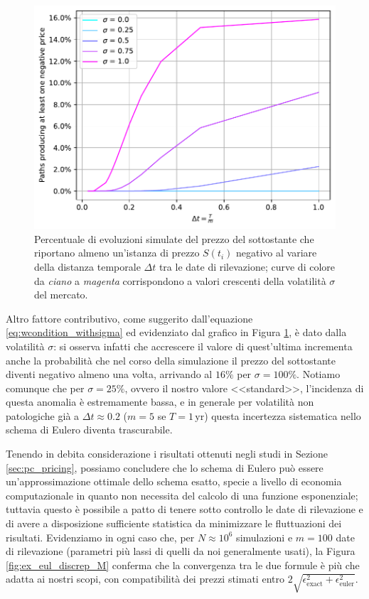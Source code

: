 \begin{figure}[t] 
    \centering
    \includegraphics[scale=0.5]{graphs/NegativePrices_PercentageVsM_VariousSigmas.pdf}
    \caption[Percentuale di evoluzioni simulate del prezzo del sottostante che riportano almeno un'istanza di prezzo negativo al variare della distanza temporale $\Delta t$ tra le date di rilevazione.]{Percentuale di evoluzioni simulate del prezzo del sottostante che riportano almeno un'istanza di prezzo $S(t_i)$ negativo al variare della distanza temporale $\Delta t$ tra le date di rilevazione; curve di colore da \textit{ciano} a \textit{magenta} corrispondono a valori crescenti della volatilità $\sigma$ del mercato.}
    \label{fig:negativeprices}
\end{figure}

Altro fattore contributivo, come suggerito dall'equazione \eqref{eq:wcondition_withsigma} ed evidenziato dal grafico in Figura \ref{fig:negativeprices}, è dato dalla volatilità $\sigma$: si osserva infatti che accrescere il valore di quest'ultima incrementa anche la probabilità che nel corso della simulazione il prezzo del sottostante diventi negativo almeno una volta, arrivando al $16\%$ per $\sigma=100\%$. Notiamo comunque che per $\sigma=25\%$, ovvero il nostro valore <<standard>>, l'incidenza di questa anomalia è estremamente bassa, e in generale per volatilità non patologiche già a $\Delta t \approx 0.2$ ($m=5$ se $T=1 \, \text{yr}$) questa incertezza sistematica nello schema di Eulero diventa trascurabile.

Tenendo in debita considerazione i risultati ottenuti negli studi in Sezione \ref{sec:pc_pricing}, possiamo concludere che lo schema di Eulero può essere un'approssimazione ottimale dello schema esatto, specie a livello di economia computazionale in quanto non necessita del calcolo di una funzione esponenziale; tuttavia questo è possibile a patto di tenere sotto controllo le date di rilevazione e di avere a disposizione sufficiente statistica da minimizzare le fluttuazioni dei risultati. Evidenziamo in ogni caso che, per $N\approx 10^6$ simulazioni e $m = 100$ date di rilevazione (parametri più lassi di quelli da noi generalmente usati), la Figura \ref{fig:ex_eul_discrep_M} conferma che la convergenza tra le due formule è più che adatta ai nostri scopi, con compatibilità dei prezzi stimati entro $2\sqrt{\epsilon_\text{exact}^2 + \epsilon_\text{euler}^2}$.